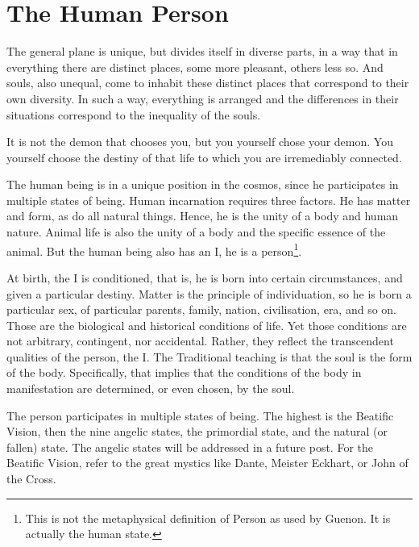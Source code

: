 \section{The Human Person}

\begin{quotex}
The general plane is unique, but divides itself in diverse parts, in a way that in everything there are distinct places, some more pleasant, others less so. And souls, also unequal, come to inhabit these distinct places that correspond to their own diversity. In such a way, everything is arranged and the differences in their situations correspond to the inequality of the souls. 

It is not the demon that chooses you, but you yourself chose your demon. You yourself choose the destiny of that life to which you are irremediably connected.  

\end{quotex}
The human being is in a unique position in the cosmos, since he participates in multiple states of being. Human incarnation requires three factors. He has matter and form, as do all natural things. Hence, he is the unity of a body and human nature. Animal life is also the unity of a body and the specific essence of the animal. But the human being also has an I, he is a person\footnote{This is not the metaphysical definition of Person as used by Guenon. It is actually the human state.}.

At birth, the I is conditioned, that is, he is born into certain circumstances, and given a particular destiny. Matter is the principle of individuation, so he is born a particular sex, of particular parents, family, nation, civilisation, era, and so on. Those are the biological and historical conditions of life. Yet those conditions are not arbitrary, contingent, nor accidental. Rather, they reflect the transcendent qualities of the person, the I. The Traditional teaching is that the soul is the form of the body. Specifically, that implies that the conditions of the body in manifestation are determined, or even chosen, by the soul.

The person participates in multiple states of being. The highest is the Beatific Vision, then the nine angelic states, the primordial state, and the natural (or fallen) state. The angelic states will be addressed in a future post. For the Beatific Vision, refer to the great mystics like Dante, Meister Eckhart, or John of the Cross.

